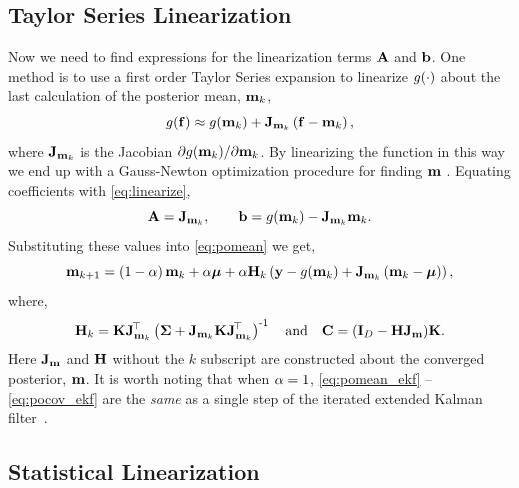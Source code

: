 \documentclass{article} %
\begin{document}
\subsection{Taylor Series Linearization}

Now we need to find expressions for the linearization terms $\mathbf{A}$ and
$\mathbf{b}$. One method is to use a first order Taylor Series expansion to 
linearize $g\!\left({{\cdot}}\right)$ about the last calculation of the posterior mean, 
$\mathbf{m}_k$,
\begin{equation}
    g\!\left({{\mathbf{f}}}\right) \approx g\!\left({{\mathbf{m}_k}}\right) +
    \mathbf{J}_{\mathbf{m}_k}\left({\mathbf{f} - \mathbf{m}_k}\right),
\end{equation}
where $\mathbf{J}_{\mathbf{m}_k}$ is the Jacobian $\partial g\!\left({{\mathbf{m}_k}}\right)\!/
\partial\mathbf{m}_k$. By linearizing the function in this way we end up with a
Gauss-Newton optimization procedure for finding $\mathbf{m}$ \cite{Nocedal2006}.
Equating coefficients with \eqref{eq:linearize},
\begin{equation}
    \mathbf{A} = \mathbf{J}_{\mathbf{m}_k}, \qquad \mathbf{b} = g\!\left({{\mathbf{m}_k}}\right) -
    \mathbf{J}_{\mathbf{m}_k}\mathbf{m}_k.
\end{equation}
Substituting these values into \eqref{eq:pomean} we get,
\begin{equation}
    \mathbf{m}_{k+1} = \left({1-\alpha}\right)\mathbf{m}_k + \alpha\boldsymbol{\mu} 
        + \alpha\mathbf{H}_k\left({\mathbf{y} - g\!\left({{\mathbf{m}_k}}\right) 
        + \mathbf{J}_{\mathbf{m}_k}\left({\mathbf{m}_k - \boldsymbol{\mu}}\right)}\right),
    \label{eq:pomean_ekf}
\end{equation}
where,
\begin{equation}
    \mathbf{H}_k = \mathbf{K}\mathbf{J}_{\mathbf{m}_k}^{\!\top}\left({\boldsymbol{\Sigma} +
        \mathbf{J}_{\mathbf{m}_k}\mathbf{K}\mathbf{J}_{\mathbf{m}_k}^{\!\top}}\right)^{\text{-}1}
    \quad\text{and}\quad
    \mathbf{C} = \left({\mathbf{I}_{D} - \mathbf{H}\mathbf{J}_{\mathbf{m}}}\right)\!\mathbf{K}.
    \label{eq:pocov_ekf}
\end{equation}
Here $\mathbf{J}_{\mathbf{m}}$ and $\mathbf{H}$ without the $k$ subscript are constructed
about the converged posterior, $\mathbf{m}$. It is worth noting that when $\alpha =
1$, \eqref{eq:pomean_ekf} -- \eqref{eq:pocov_ekf} are the \emph{same} as a
single step of the iterated extended Kalman filter~\cite{Bell1993, Sibley2006}.


\subsection{Statistical Linearization}
\end{document}
